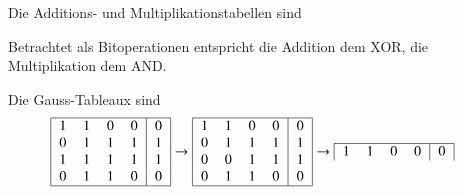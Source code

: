 \begin{loesung}
\begin{teilaufgaben}
\item
Die Additions- und Multiplikationstabellen sind
\begin{center}
\end{center}
Betrachtet als Bitoperationen entspricht die Addition dem XOR, die
Multiplikation dem AND.
\item
Die Gauss-Tableaux sind
\begin{align*}
\begin{tabular}{|>{$}c<{$}>{$}c<{$}>{$}c<{$}>{$}c<{$}|>{$}c<{$}|}
\hline
   1 & 1 & 0 & 0 &  0\\
   0 & 1 & 1 & 1 &  1\\
   1 & 1 & 1 & 1 &  1\\
   0 & 1 & 1 & 0 &  0\\
\hline
\end{tabular}
&\to
\begin{tabular}{|>{$}c<{$}>{$}c<{$}>{$}c<{$}>{$}c<{$}|>{$}c<{$}|}
\hline
   1 & 1 & 0 & 0 &  0\\
   0 & 1 & 1 & 1 &  1\\
   0 & 0 & 1 & 1 &  1\\
   0 & 1 & 1 & 0 &  0\\
\hline
\end{tabular}
\to
\begin{tabular}{|>{$}c<{$}>{$}c<{$}>{$}c<{$}>{$}c<{$}|>{$}c<{$}|}
\hline
   1 & 1 & 0 & 0 &  0\\

\end{tabular}
\end{align*}
\end{teilaufgaben}
\end{loesung}
